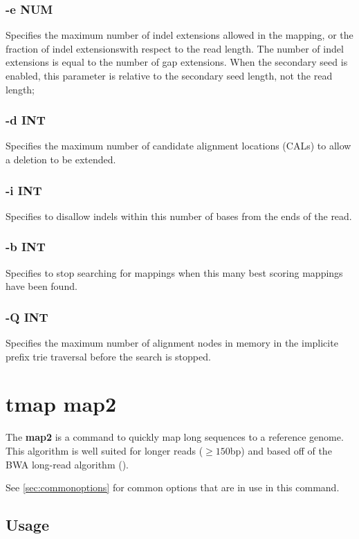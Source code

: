 \documentclass[a4paper,12pt]{book}
\newcommand{\BF}[1]{{\bf #1}} %
\begin{document}
\subsubsection{-e NUM}
Specifies the maximum number of indel extensions allowed in the mapping, or the fraction of indel extensionswith respect to the read length.
The number of indel extensions is equal to the number of gap extensions.
When the secondary seed is enabled, this parameter is relative to the secondary seed length, not the read length;

\subsubsection{-d INT}
Specifies the maximum number of candidate alignment locations (CALs) to allow a deletion to be extended.

\subsubsection{-i INT}
Specifies to disallow indels within this number of bases from the ends of the read.

\subsubsection{-b INT}
Specifies to stop searching for mappings when this many best scoring mappings have been found.

\subsubsection{-Q INT}
Specifies the maximum number of alignment nodes in memory in the implicite prefix trie traversal before the search is stopped.

\section{tmap map2}
\label{sec:map2}
The \BF{map2} is a command to quickly map long sequences to a reference genome.
This algorithm is well suited for longer reads ($\geq 150$bp) and based off of the BWA long-read algorithm (\cite{BWA-long}).

See \autoref{sec:commonoptions} for common options that are in use in this command.

\subsection{Usage}
\end{document}
